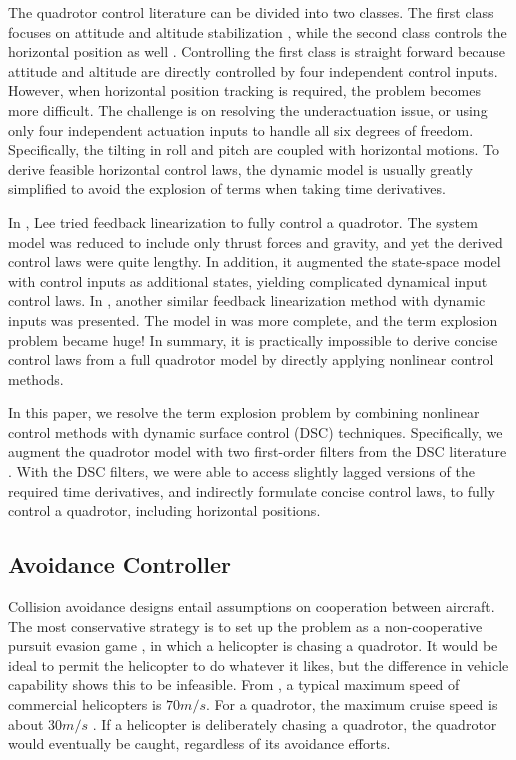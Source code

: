 \documentclass[journal,11pt,onecolumn,draftclsnofoot,]{IEEEtran}
\begin{document}
The quadrotor control literature can be divided into two classes. The first class focuses on attitude and altitude stabilization \cite{bouabdallah2004pid, li2011dynamic, madani2006backstepping_2, bouabdallah2005backstepping, bouadi2011adaptive}, while the second class controls the horizontal position as well \cite{lee2009feedback, xu2006sliding, taniguchi2014quadrotor}. Controlling the first class is straight forward because attitude and altitude are directly controlled by four independent control inputs. However, when horizontal position tracking is required, the problem becomes more difficult. The challenge is on resolving the underactuation issue, or using only four independent actuation inputs to handle all six degrees of freedom. Specifically, the tilting in roll and pitch are coupled with horizontal motions. To derive feasible horizontal control laws, the dynamic model is usually greatly simplified \cite{lee2009feedback, xu2006sliding} to avoid the explosion of terms when taking time derivatives.

In \cite{lee2009feedback}, Lee tried feedback linearization to fully control a quadrotor. The system model was reduced to include only thrust forces and gravity, and yet the derived control laws were quite lengthy. In addition, it augmented the state-space model with control inputs as additional states, yielding complicated dynamical input control laws. In \cite{taniguchi2014quadrotor}, another similar feedback linearization method with dynamic inputs was presented. The model in \cite{taniguchi2014quadrotor} was more complete, and the term explosion problem became huge! In summary, it is practically impossible to derive concise control laws from a full quadrotor model by directly applying nonlinear control methods.

In this paper, we resolve the term explosion problem by combining nonlinear control methods with dynamic surface control (DSC) techniques. Specifically, we augment the quadrotor model with two first-order filters from the DSC literature \cite{song2011dynamic}. With the DSC filters, we were able to access slightly lagged versions of the required time derivatives, and indirectly formulate concise control laws, to fully control a quadrotor, including horizontal positions.

\subsection{Avoidance Controller}

Collision avoidance designs entail assumptions on cooperation between aircraft. The most conservative strategy is to set up the problem as a non-cooperative pursuit evasion game \cite{lygeros1999controllers}, in which a helicopter is chasing a quadrotor. It would be ideal to permit the helicopter to do whatever it likes, but the difference in vehicle capability shows this to be infeasible. From \cite{helicopter_common_speed}, a typical maximum speed of commercial helicopters is $70m/s$. For a quadrotor, the maximum cruise speed is about $30m/s$ \cite{quadrotor_common_speed}. If a helicopter is deliberately chasing a quadrotor, the quadrotor would eventually be caught, regardless of its avoidance efforts. 
\end{document}
